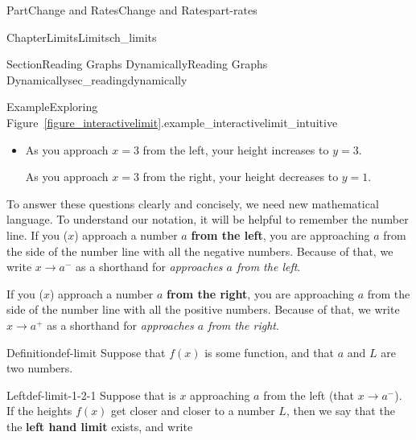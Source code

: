 \documentclass[oneside,10pt,]{tufte-book}
\newcommand{\xreffont}{\relax}
\newcommand{\terminology}[1]{\textbf{#1}}
\numberwithin{equation}{chapter}
\begin{document}
\begin{partptx}{Part}{Change and Rates}{}{Change and Rates}{}{}{part-rates}
\begin{chapterptx}{Chapter}{Limits}{}{Limits}{}{}{ch_limits}
\begin{sectionptx}{Section}{Reading Graphs Dynamically}{}{Reading Graphs Dynamically}{}{}{sec_readingdynamically}
\begin{example}{Example}{Exploring Figure~{\xreffont\ref*{figure_interactivelimit}}.}{example_interactivelimit_intuitive}
\begin{itemize}[label=\textbullet]
\begin{enumerate}
\end{enumerate}
%
\item{}As you approach \(x=3\) from the left, your height increases to \(y=3\).%
\par
As you approach \(x=3\) from the right, your height decreases to \(y=1\).%
\end{itemize}
\end{example}
To answer these questions clearly and concisely, we need new mathematical language. To understand our notation, it will be helpful to remember the number line. If you (\(x\)) approach a number \(a\) \terminology{from the left}, you are approaching \(a\) from the side of the number line with all the negative numbers. Because of that, we write \(x\rightarrow a^-\) as a shorthand for \emph{approaches \(a\) from the left}. \begin{image}{0.335}{0.33}{0.335}{}%
%
\end{image}%
 If you (\(x\)) approach a number \(a\) \terminology{from the right}, you are approaching \(a\) from the side of the number line with all the positive numbers. Because of that, we write \(x\rightarrow a^+\) as a shorthand for \emph{approaches \(a\) from the right}. \begin{image}{0.335}{0.33}{0.335}{}%
%
\end{image}%
%
\begin{definition}{Definition}{}{def-limit}%
Suppose that \(f(x)\) is some function, and that \(a\) and \(L\) are two numbers.%
%
\begin{descriptionlist}
\begin{dlimedium}{Left}{def-limit-1-2-1}%
Suppose that is \(x\) approaching \(a\) from the left (that \(x\rightarrow a^-\)). If the heights \(f(x)\) get closer and closer to a number \(L\), then we say that the the \terminology{left hand limit} exists, and write%

\end{dlimedium}
\end{descriptionlist}
\end{definition}
\end{sectionptx}
\end{chapterptx}
\end{partptx}
\end{document}
